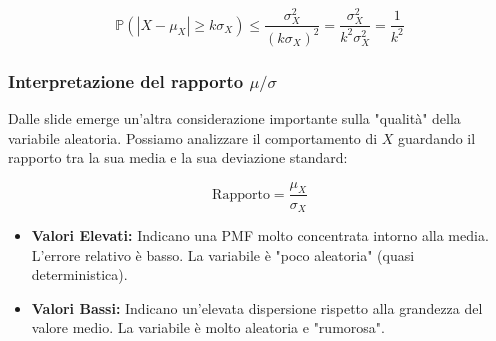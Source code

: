 \[
\mathbb{P}(|X - \mu_X| \ge k\sigma_X) \le \frac{\sigma_X^2}{(k\sigma_X)^2} = \frac{\sigma_X^2}{k^2 \sigma_X^2} = \frac{1}{k^2}
\]

\subsubsection{Interpretazione del rapporto $\mu / \sigma$}
Dalle slide emerge un'altra considerazione importante sulla "qualità" della variabile aleatoria.
Possiamo analizzare il comportamento di $X$ guardando il rapporto tra la sua media e la sua deviazione standard:

\begin{equation}
\text{Rapporto} = \frac{\mu_X}{\sigma_X}
\end{equation}

\begin{itemize}
    \item \textbf{Valori Elevati:} Indicano una PMF molto concentrata intorno alla media. L'errore relativo è basso. La variabile è "poco aleatoria" (quasi deterministica).
    \item \textbf{Valori Bassi:} Indicano un'elevata dispersione rispetto alla grandezza del valore medio. La variabile è molto aleatoria e "rumorosa".
\end{itemize}